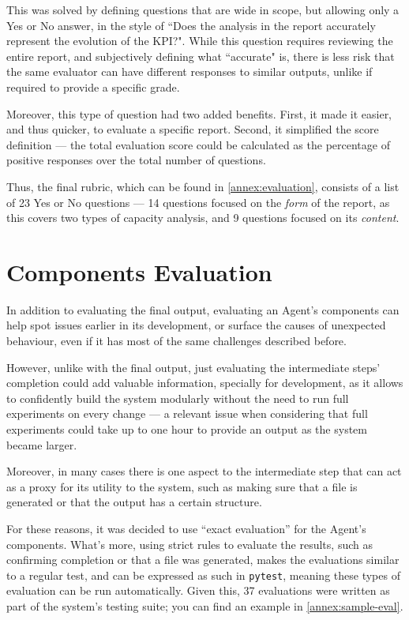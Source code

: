\documentclass[a4paper]{report}
\begin{document}
This was solved by defining questions that are wide in scope, but allowing only a Yes or No answer, in the style of ``Does the analysis in the report accurately represent the evolution of the KPI?". While this question requires reviewing the entire report, and subjectively defining what ``accurate" is, there is less risk that the same evaluator can have different responses to similar outputs, unlike if required to provide a specific grade.

Moreover, this type of question had two added benefits. First, it made it easier, and thus quicker, to evaluate a specific report. Second, it simplified the score definition --- the total evaluation score could be calculated as the percentage of positive responses over the total number of questions.

Thus, the final rubric, which can be found in \autoref{annex:evaluation}, consists of a list of 23 Yes or No questions --- 14 questions focused on the \textit{form} of the report, as this covers two types of capacity analysis, and 9 questions focused on its \textit{content}.

\section{Components Evaluation}
\label{sec:components-evals}

In addition to evaluating the final output, evaluating an Agent's components can help spot issues earlier in its development, or surface the causes of unexpected behaviour, even if it has most of the same challenges described before.

However, unlike with the final output, just evaluating the intermediate steps' completion could add valuable information, specially for development, as it allows to confidently build the system modularly without the need to run full experiments on every change --- a relevant issue when considering that full experiments could take up to one hour to provide an output as the system became larger.

Moreover, in many cases there is one aspect to the intermediate step that can act as a proxy for its utility to the system, such as making sure that a file is generated or that the output has a certain structure.

For these reasons, it was decided to use ``exact evaluation'' for the Agent's components. What's more, using strict rules to evaluate the results, such as confirming completion or that a file was generated, makes the evaluations similar to a regular test, and can be expressed as such in \texttt{pytest}, meaning these types of evaluation can be run automatically. Given this, 37 evaluations were written as part of the system's testing suite; you can find an example in \autoref{annex:sample-eval}.
\end{document}

